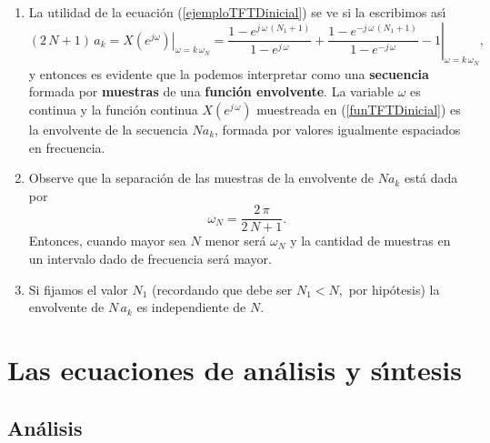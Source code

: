 \begin{enumerate}
\item  La utilidad de la ecuaci\'{o}n (\ref{ejemploTFTDinicial}) se ve si la escribimos as\'{\i}
  \begin{equation}
    (2 \, N + 1) \, a_{k} = \left. X(e^{j \omega}) \right|_{\omega = k \, \omega_{N}} =
    \left.
      \frac{1 - e^{j \, \omega \, (N_{1}+1)}}{1 - e^{j \, \omega}}  +
      \frac{1 - e^{-j \, \omega \, (N_{1}+1)}}{1 - e^{-j \, \omega}}  -
      1
    \right|_{\omega=k \, \omega_{N}},  \label{funTFTDinicial}
  \end{equation}
  y entonces es evidente que la podemos interpretar como una \textbf{secuencia} formada por
  \textbf{muestras} de una  \textbf{funci\'{o}n envolvente}. La variable $\omega $ es continua y la
  funci\'{o}n continua $X(e^{j \, \omega})$ muestreada en (\ref{funTFTDinicial}) es la envolvente de la secuencia 
  $N a_{k}$, formada por valores igualmente espaciados en frecuencia.
  
\item   Observe que la separaci\'{o}n de las muestras de la envolvente de $N a_{k}$ est\'{a} dada por
  \begin{equation}
    \omega_{N} = \frac{2 \, \pi}{2 \, N + 1}.
  \end{equation}
  Entonces, cuando mayor sea $N$ menor ser\'{a} $\omega_{N}$ y la cantidad de muestras en un 
  intervalo dado de frecuencia ser\'{a} mayor.
  
\item  Si fijamos el valor $N_{1}$ (recordando que debe ser $N_{1} < N,$ por hip\'{o}tesis) la 
  envolvente de $N \, a_{k}$ es independiente de $N$.
        
\end{enumerate}

\section{Las ecuaciones de an\'{a}lisis y s\'{\i}ntesis}

\subsection{Análisis}

